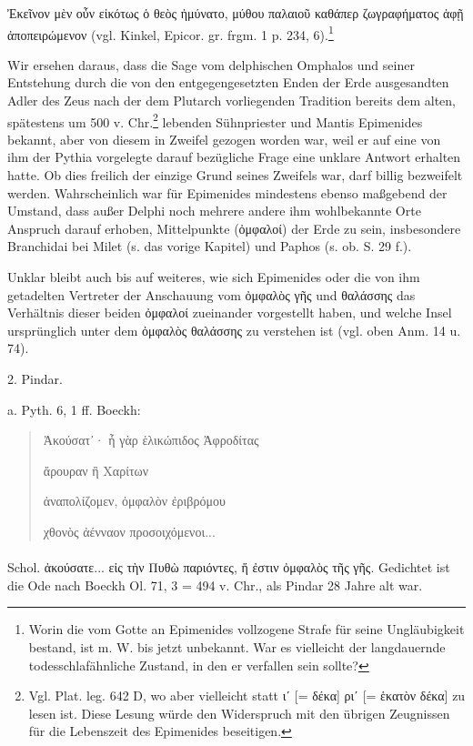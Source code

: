 \documentclass[a4paper, 11pt, oneside]{article}
\begin{document}
Ἐκεῖνον μὲν οὖν εἰκότως ὁ θεὸς ἠμύνατο, μύθου παλαιοῦ καθάπερ ζωγραφήματος ἁφῇ ἀποπειρώμενον (vgl. Kinkel, Epicor. gr. frgm. 1 p. 234, 6).\footnote{Worin die vom Gotte an Epimenides vollzogene Strafe für seine Ungläubigkeit bestand, ist m. W. bis jetzt unbekannt. War es vielleicht der langdauernde todesschlafähnliche Zustand, in den er verfallen sein sollte?}

Wir ersehen daraus, dass die Sage vom delphischen Omphalos und seiner Entstehung durch die von den entgegengesetzten Enden der Erde ausgesandten Adler des Zeus nach der dem Plutarch vorliegenden Tradition bereits dem alten, spätestens um 500 v. Chr.\footnote{Vgl. Plat. leg. 642 D, wo aber vielleicht statt ιʹ [= δέκα] ριʹ [= ἑκατὸν δέκα] zu lesen ist. Diese Lesung würde den Widerspruch mit den übrigen Zeugnissen für die Lebenszeit des Epimenides beseitigen.} lebenden Sühnpriester und Mantis Epimenides bekannt, aber von diesem in Zweifel gezogen worden war, weil er auf eine von ihm der Pythia vorgelegte darauf bezügliche Frage eine unklare Antwort erhalten hatte. Ob dies freilich der einzige Grund seines Zweifels war, darf billig bezweifelt werden. Wahrscheinlich war für Epimenides mindestens ebenso maßgebend der Umstand, dass außer Delphi noch mehrere andere ihm wohlbekannte Orte Anspruch darauf erhoben, Mittelpunkte (ὀμφαλοί) der Erde zu sein, insbesondere Branchidai bei Milet (s. das vorige Kapitel) und Paphos (s. ob. S. 29 f.).

Unklar bleibt auch bis auf weiteres, wie sich Epimenides oder die von ihm getadelten Vertreter der Anschauung vom ὀμφαλὸς γῆς und θαλάσσης das Verhältnis dieser beiden ὀμφαλοί zueinander vorgestellt haben, und welche Insel ursprünglich unter dem ὀμφαλὸς θαλάσσης zu verstehen ist (vgl. oben Anm. 14 u. 74).

2. Pindar.

a. Pyth. 6, 1 ff. Boeckh:
\begin{quotation}
Ἀκούσατ᾽· ἦ γὰρ ἑλικώπιδος Ἀφροδίτας

ἄρουραν ἢ Χαρίτων

ἀναπολίζομεν, ὀμφαλὸν ἐριβρόμου

χθονὸς ἀένναον προσοιχόμενοι...
\end{quotation}
\paragraph{}
Schol. ἀκούσατε... εἰς τὴν Πυθὼ παριόντες, ἥ ἐστιν ὀμφαλὸς τῆς γῆς. Gedichtet ist die Ode nach Boeckh Ol. 71, 3 = 494 v. Chr., als Pindar 28 Jahre alt war.
\end{document}
